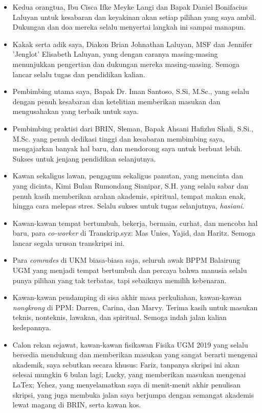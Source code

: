 \documentclass{skripsiactugm}
\begin{document}
\begin{itemize}
	\item Kedua orangtua, Ibu Cisca Ifke Meyke Langi dan Bapak Daniel Bonifacius
	      Laluyan untuk kesabaran dan keyakinan akan setiap pilihan yang saya ambil.
	      Dukungan dan doa mereka selalu menyertai langkah ini sampai manapun.

	\item Kakak serta adik saya, Diakon Brian Johnathan Laluyan, MSF dan Jennifer
	      'Jenglot' Elisabeth Laluyan, yang dengan caranya masing-masing menunjukkan
	      pengertian dan dukungan mereka masing-masing. Semoga lancar selalu tugas dan
	      pendidikan kalian.

	\item Pembimbing utama saya, Bapak Dr. Iman Santoso, S.Si, M.Sc., yang selalu
	      dengan penuh kesabaran dan ketelitian memberikan masukan dan mengusahakan yang
	      terbaik untuk saya.

	\item Pembimbing praktisi dari BRIN, Sleman, Bapak Ahsani Hafizhu Shali, S.Si.,
	      M.Sc. yang penuh dedikasi tinggi dan kesabaran membimbing saya,
	      mengajarkan banyak hal baru, dan mendorong saya untuk berbuat lebih.
	      Sukses untuk jenjang pendidikan selanjutnya.

	\item Kawan sekaligus lawan, pengagum sekaligus panutan, yang mencinta dan yang
	      dicinta, Kimi Bulan Rumondang Sianipar, S.H. yang selalu sabar dan penuh
	      kasih memberikan arahan akademis, spiritual, tempat makan enak, hingga cara
	      melepas stres. Selalu sukses untuk tugas selanjutnya, \textit{hasiani}.

	\item Kawan-kawan tempat bertumbuh, bekerja, bermain, curhat, dan mencoba hal
	      baru, para \textit{co-worker} di Transkrip.syz: Mas Unies, Yajid, dan
	      Haritz. Semoga lancar segala urusan transkripsi ini.

	\item Para \textit{comrades} di UKM biasa-biasa saja, seluruh awak BPPM Balairung
	      UGM yang menjadi tempat bertumbuh dan percaya bahwa manusia selalu punya pilihan
	      yang tak terbatas, tapi sebaiknya memilih kebenaran.

	\item Kawan-kawan pendamping di sisa akhir masa perkuliahan, kawan-kawan
	      \textit{nongkrong} di PPM: Darren, Carina, dan Marvy. Terima kasih untuk masukan
	      teknis, nonteknis, lawakan, dan spiritual. Semoga indah jalan kalian kedepannya.

	\item Calon rekan sejawat, kawan-kawan fisikawan Fisika UGM 2019 yang selalu
	      bersedia mendukung dan memberikan masukan yang sangat berarti mengenai
	      akademik, saya sebutkan secara khusus: Fariz, tanpanya skripsi ini akan selesai
	      mungkin 6 bulan lagi; Lucky, yang memberikan masukan mengenai LaTex; Yehez,
	      yang menyelamatkan saya di menit-menit akhir penulisan skripsi, yang juga
	      membuka jalan saya berjumpa dengan semangat akademis lewat magang di BRIN,
	      serta kawan kos.
\end{itemize}
\end{document}
